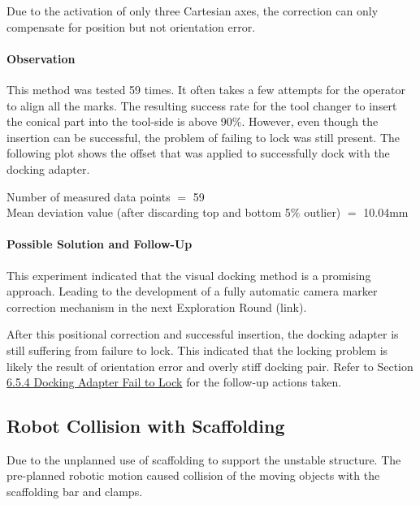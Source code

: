 {Due to the activation of only three Cartesian axes, the correction can only compensate for position but not orientation error. 

\paragraph{Observation}

This method was tested 59 times.  It often takes a few attempts for the operator to align all the marks. The resulting success rate for the tool changer to insert the conical part into the tool-side is above 90$\%$. However, even though the insertion can be successful, the problem of failing to lock was still present. The following plot shows the offset that was applied to successfully dock with the docking adapter.



{\footnotesize Number of measured data points $=$ 59 \\ Mean deviation value (after discarding top and bottom 5$\%$ outlier) $=$ 10.04mm\par}

\paragraph{Possible Solution and Follow-Up}

This experiment indicated that the visual docking method is a promising approach. Leading to the development of a fully automatic camera marker correction mechanism in the next Exploration Round (link). 

After this positional correction and successful insertion, the docking adapter is still suffering from failure to lock. This indicated that the locking problem is likely the result of orientation error and overly stiff docking pair. Refer to Section\ul{ 6.5.4 Docking Adapter Fail to Lock} for the follow-up actions taken.

\subsection{Robot Collision with Scaffolding}
\label{subsection:exploration_3_robot_collision_with_scaffolding}

Due to the unplanned use of scaffolding to support the unstable structure. The pre-planned robotic motion caused collision of the moving objects with the scaffolding bar and clamps. 



}
